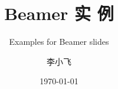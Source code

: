 \documentclass[7pt,UTF8,aspectratio=169]{beamer}
\begin{document}

\author{李小飞}
\title{\textbf{\Huge Beamer 实 例}}
\subtitle{Examples for Beamer slides}
\date{\today}


\begin{frame} [plain]
     {} %
    \maketitle
    \addtocounter{framenumber}{-1} 
\end{frame}

%


%
\end{document}
